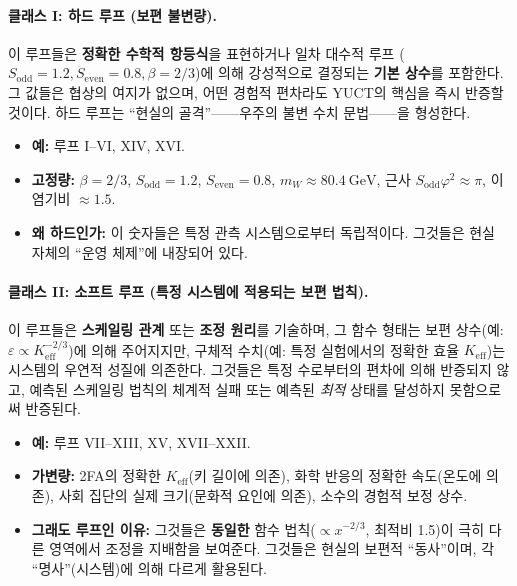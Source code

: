 \documentclass[12pt,a4paper]{article}
\begin{document}
	\paragraph{클래스 I: 하드 루프 (보편 불변량).}
	이 루프들은 \textbf{정확한 수학적 항등식}을 표현하거나 일차 대수적 루프 (\(S_{\mathrm{odd}}=1.2, S_{\mathrm{even}}=0.8, \beta=2/3\))에 의해 강성적으로 결정되는 \textbf{기본 상수}를 포함한다. 그 값들은 협상의 여지가 없으며, 어떤 경험적 편차라도 YUCT의 핵심을 즉시 반증할 것이다. 하드 루프는 ``현실의 골격''——우주의 불변 수치 문법——을 형성한다.
	\begin{itemize}
		\item \textbf{예:} 루프 I--VI, XIV, XVI.
		\item \textbf{고정량:} \(\beta = 2/3\), \(S_{\mathrm{odd}}=1.2\), \(S_{\mathrm{even}}=0.8\), \(m_W \approx 80.4\ \text{GeV}\), 근사 \(S_{\mathrm{odd}}\varphi^2 \approx \pi\), 이염기비 \(\approx 1.5\).
		\item \textbf{왜 하드인가:} 이 숫자들은 특정 관측 시스템으로부터 독립적이다. 그것들은 현실 자체의 ``운영 체제''에 내장되어 있다.
	\end{itemize}
	
	\paragraph{클래스 II: 소프트 루프 (특정 시스템에 적용되는 보편 법칙).}
	이 루프들은 \textbf{스케일링 관계} 또는 \textbf{조정 원리}를 기술하며, 그 함수 형태는 보편 상수(예: \(\varepsilon \propto K_{\mathrm{eff}}^{-2/3}\))에 의해 주어지지만, 구체적 수치(예: 특정 실험에서의 정확한 효율 \(K_{\mathrm{eff}}\))는 시스템의 우연적 성질에 의존한다. 그것들은 특정 수로부터의 편차에 의해 반증되지 않고, 예측된 스케일링 법칙의 체계적 실패 또는 예측된 \textit{최적} 상태를 달성하지 못함으로써 반증된다.
	\begin{itemize}
		\item \textbf{예:} 루프 VII--XIII, XV, XVII--XXII.
		\item \textbf{가변량:} 2FA의 정확한 \(K_{\mathrm{eff}}\)(키 길이에 의존), 화학 반응의 정확한 속도(온도에 의존), 사회 집단의 실제 크기(문화적 요인에 의존), 소수의 경험적 보정 상수.
		\item \textbf{그래도 루프인 이유:} 그것들은 \textbf{동일한} 함수 법칙(\(\propto x^{-2/3}\), 최적비 1.5)이 극히 다른 영역에서 조정을 지배함을 보여준다. 그것들은 현실의 보편적 ``동사''이며, 각 ``명사''(시스템)에 의해 다르게 활용된다.
	\end{itemize}
	
\end{document}
